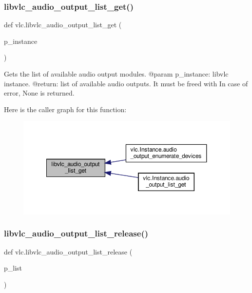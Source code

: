 \subsubsection{\texorpdfstring{libvlc\+\_\+audio\+\_\+output\+\_\+list\+\_\+get()}{libvlc\_audio\_output\_list\_get()}}
{\footnotesize\ttfamily def vlc.\+libvlc\+\_\+audio\+\_\+output\+\_\+list\+\_\+get (\begin{DoxyParamCaption}\item[{}]{p\+\_\+instance }\end{DoxyParamCaption})}

\begin{DoxyVerb}Gets the list of available audio output modules.
@param p_instance: libvlc instance.
@return: list of available audio outputs. It must be freed with In case of error, None is returned.
\end{DoxyVerb}
 Here is the caller graph for this function\+:
\nopagebreak
\begin{figure}[H]
\begin{center}
\leavevmode
\includegraphics[width=350pt]{namespacevlc_a8261ae46b9414ab68671c6c9d2799d47_icgraph}
\end{center}
\end{figure}
\mbox{\label{namespacevlc_aa3a70d05c0ceda7ef8abf29e5f0237bc}} 
\subsubsection{\texorpdfstring{libvlc\+\_\+audio\+\_\+output\+\_\+list\+\_\+release()}{libvlc\_audio\_output\_list\_release()}}
{\footnotesize\ttfamily def vlc.\+libvlc\+\_\+audio\+\_\+output\+\_\+list\+\_\+release (\begin{DoxyParamCaption}\item[{}]{p\+\_\+list }\end{DoxyParamCaption})}

